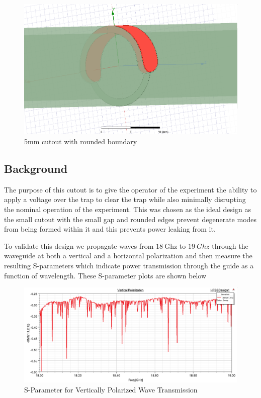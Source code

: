 \documentclass[12pt,letterpaper]{article}
\begin{document}
        \begin{figure}[H]
    \centering
    \includegraphics[width=0.9\linewidth]{img/cutout.png}
    \caption{5mm cutout with rounded boundary}
    \end{figure}
    
\subsection*{Background}
    
The purpose of this cutout is to give the operator of the experiment the ability to apply a voltage over the trap to clear the trap while also minimally disrupting the nominal operation of the experiment. This was chosen as the ideal design as the small cutout with the small gap and rounded edges prevent degenerate modes from being formed within it and this prevents power leaking from it. 

To validate this design we propagate waves from $18~$Ghz to $19~Ghz$ through the waveguide at both a vertical and a horizontal polarization and then measure the resulting S-parameters which indicate power transmission through the guide as a function of wavelength. These S-parameter plots are shown below

    \begin{figure}[H]
    \centering
    \includegraphics[width=\linewidth]{img/sparam_vert.png}
    \caption{S-Parameter for Vertically Polarized Wave Transmission}
    \end{figure}
    
\end{document}
